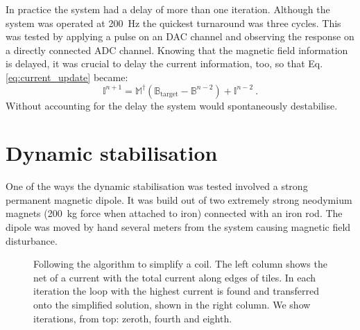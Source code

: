 In practice the system had a delay of more than one iteration. Although the system was operated at \SI{200}{\hertz} the quickest turnaround was three cycles. This was tested by applying a pulse on an DAC channel and observing the response on a directly connected ADC channel. Knowing that the magnetic field information is delayed, it was crucial to delay the current information, too, so that Eq.\,\ref{eq:current_update} became:
\begin{equation}
  \mathbb{I}^{n+1} = \mathbb{M}^\dagger \left( \mathbb{B}_\text{target} - \mathbb{B}^{n-2} \right) + \mathbb{I}^{n-2} \ .
\end{equation}
Without accounting for the delay the system would spontaneously destabilise.



\section{Dynamic stabilisation}
One of the ways the dynamic stabilisation was tested involved a strong permanent magnetic dipole. It was build out of two extremely strong neodymium magnets (\SI{200}{\kilo\gram} force when attached to iron) connected with an iron rod. The dipole was moved by hand several meters from the system causing magnetic field disturbance.


\begin{figure}
  \centering
  \quad
  \caption{Following the algorithm to simplify a coil. The left column shows the net of a current with the total current along edges of tiles. In each iteration the loop with the highest current is found and transferred onto the simplified solution, shown in the right column. We show iterations, from top: zeroth, fourth and eighth.}
  \label{fig:prototype_compensation_time}
\end{figure}

